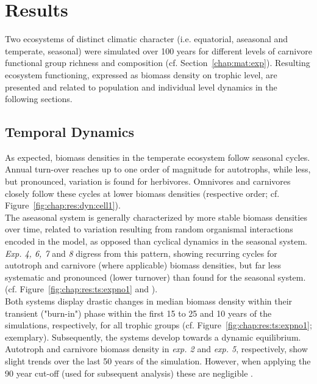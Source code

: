\chapter{Results}
\label{chap:res}
Two ecosystems of distinct climatic character (i.e. equatorial, aseasonal and temperate, seasonal) were simulated over 100 years for different levels of carnivore functional group richness and composition (cf. Section~\ref{chap:mat:exp}). Resulting ecosystem functioning, expressed as biomass density on trophic level, are presented and related to population and individual level dynamics in the following sections.

\section{Temporal Dynamics}
\label{chap:res:dyn:temporal}


As expected, biomass densities in the temperate ecosystem follow seasonal cycles.
 Annual turn-over reaches up to one order of magnitude for autotrophs, while less, but pronounced, variation is found for herbivores.
  Omnivores and carnivores closely follow these cycles at lower biomass densities (respective order; cf. Figure~\ref{fig:chap:res:dyn:cell1}). \\
  The aseasonal system is generally characterized by more stable biomass densities over time, related to variation resulting from random organismal interactions encoded in the model, as opposed than cyclical dynamics in the seasonal system. 
  \textit{Exp. 4, 6, 7} and \textit{8} digress from this pattern, showing recurring cycles for autotroph and carnivore (where applicable) biomass densities, but far less systematic and pronounced (lower turnover) than found for the seasonal system. 
(cf. Figure~\ref{fig:chap:res:ts:expno1} and ).\\
Both systems display drastic changes in median biomass density within their transient ("burn-in") phase within the first 15 to 25 and 10 years of the simulations, respectively, for all trophic groups (cf. Figure~\ref{fig:chap:res:ts:expno1}; exemplary). 
Subsequently, the systems develop towards a dynamic equilibrium. 
Autotroph and carnivore  biomass density in \textit{exp. 2} and \textit{exp. 5}, respectively, show slight trends over the last 50 years of the simulation. 
However, when applying the 90 year cut-off (used for subsequent analysis) these are negligible .\\\\ 


